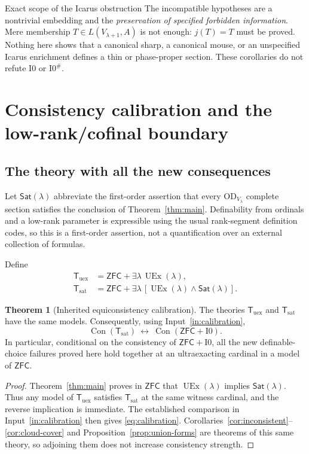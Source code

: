 \documentclass[11pt,letterpaper]{article}
\theoremstyle{definition}
\newtheorem{theorem}[definition]{Theorem}
\newcommand{\ZFC}{\mathsf{ZFC}}
\newcommand{\OD}{\mathrm{OD}}
\newcommand{\UEx}{\operatorname{UEx}}
\newcommand{\Con}{\operatorname{Con}}
\newcommand{\Izero}{\mathrm{I0}}
\newcommand{\Isharp}{\mathrm{I0}^{\#}}
\numberwithin{equation}{section}
\newcommand{\Sat}{\mathsf{Sat}}
\begin{document}
\begin{assessment}{Exact scope of the Icarus obstruction}
The incompatible hypotheses are a nontrivial embedding and the \emph{preservation of specified forbidden information}. Mere membership $T\in L(V_{\lambda+1},A)$ is not enough: $j(T)=T$ must be proved. Nothing here shows that a canonical sharp, a canonical mouse, or an unspecified Icarus enrichment defines a thin or phase-proper section. These corollaries do not refute $\Izero$ or $\Isharp$.
\end{assessment}

\section{Consistency calibration and the low-rank/cofinal boundary}\label{sec:consistency}

\subsection{The theory with all the new consequences}

Let $\Sat(\lambda)$ abbreviate the first-order assertion that every $\OD_{V_\lambda}$ complete section satisfies the conclusion of Theorem~\ref{thm:main}. Definability from ordinals and a low-rank parameter is expressible using the usual rank-segment definition codes, so this is a first-order assertion, not a quantification over an external collection of formulas.

Define
\begin{align*}
\mathsf T_{\mathrm{uex}}&=\ZFC+\exists\lambda\,\UEx(\lambda),\\
\mathsf T_{\mathrm{sat}}&=\ZFC+\exists\lambda\,[\UEx(\lambda)\wedge\Sat(\lambda)].
\end{align*}

\begin{theorem}[Inherited equiconsistency calibration]\label{thm:calibration}
The theories $\mathsf T_{\mathrm{uex}}$ and $\mathsf T_{\mathrm{sat}}$ have the same models. Consequently, using Input~\ref{in:calibration},
\begin{equation}
\Con(\mathsf T_{\mathrm{sat}})
\ \longleftrightarrow\
\Con(\ZFC+\Izero).
\label{eq:calibration}
\end{equation}
In particular, conditional on the consistency of $\ZFC+\Izero$, all the new definable-choice failures proved here hold together at an ultraexacting cardinal in a model of $\ZFC$.
\end{theorem}
\begin{proof}
Theorem~\ref{thm:main} proves in $\ZFC$ that $\UEx(\lambda)$ implies $\Sat(\lambda)$. Thus any model of $\mathsf T_{\mathrm{uex}}$ satisfies $\mathsf T_{\mathrm{sat}}$ at the same witness cardinal, and the reverse implication is immediate. The established comparison in Input~\ref{in:calibration} then gives \eqref{eq:calibration}. Corollaries~\ref{cor:inconsistent}--\ref{cor:cloud-cover} and Proposition~\ref{prop:union-forms} are theorems of this same theory, so adjoining them does not increase consistency strength.
\end{proof}
\end{document}
